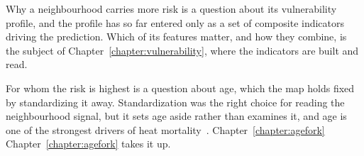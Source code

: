 Why a neighbourhood carries more risk is a question about its vulnerability profile, and the profile has so far entered only as a set of composite indicators driving the prediction. Which of its features matter, and how they combine, is the subject of Chapter~\ref{chapter:vulnerability}, where the indicators are built and read.

For whom the risk is highest is a question about age, which the map holds fixed by standardizing it away. Standardization was the right choice for reading the neighbourhood signal, but it sets age aside rather than examines it, and age is one of the strongest drivers of heat mortality~\citep{gasparrini2022smallarea}. Chapter~\ref{chapter:agefork} Chapter~\ref{chapter:agefork} takes it up.

